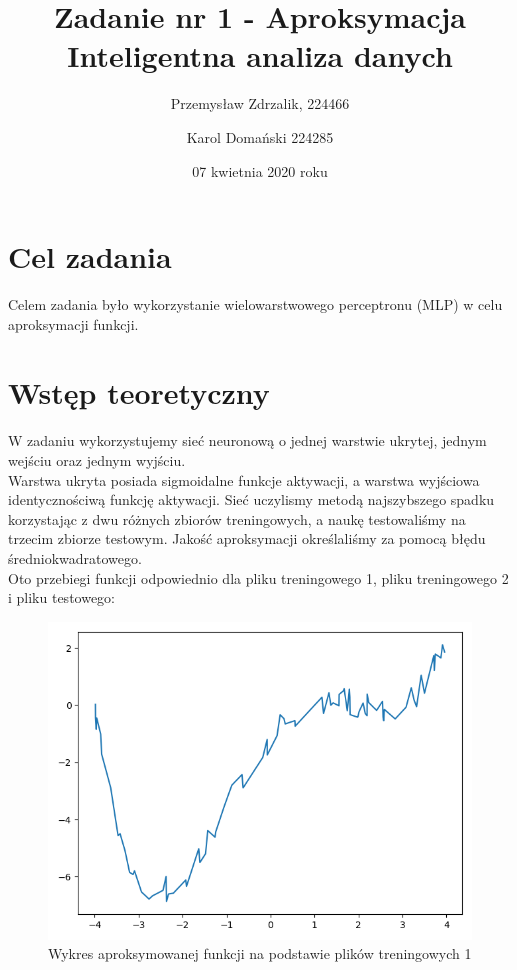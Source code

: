 \documentclass[12pt]{article}
\title{{\bf Zadanie nr 1 - Aproksymacja}\linebreak
Inteligentna analiza danych}
\author{Przemysław Zdrzalik, 224466 \and Karol Domański 224285}
\date{07 kwietnia 2020 roku}
\begin{document}
\clearpage\maketitle
\thispagestyle{empty}
\newpage
\setcounter{page}{1}
\section{Cel zadania}

Celem zadania było wykorzystanie wielowarstwowego perceptronu (MLP) w celu aproksymacji funkcji.

\section{Wstęp teoretyczny}

W zadaniu wykorzystujemy sieć neuronową o jednej warstwie ukrytej, jednym wejściu oraz jednym wyjściu. \\ Warstwa ukryta posiada sigmoidalne funkcje aktywacji, a warstwa wyjściowa identycznościwą funkcję aktywacji. Sieć uczylismy metodą najszybszego spadku  korzystając z dwu różnych zbiorów treningowych, a naukę testowaliśmy na trzecim zbiorze testowym.
Jakość aproksymacji określaliśmy za pomocą błędu średniokwadratowego.\\

Oto przebiegi funkcji odpowiednio dla pliku treningowego 1, pliku treningowego 2 i pliku testowego:

\begin{figure}[!htb]
 \centering
 \includegraphics[width=12cm]{originalfunc1.png}
 \caption{Wykres aproksymowanej funkcji na podstawie plików treningowych 1}
 \vspace{-0.3cm}
 \label{originalfunc1}
\end{figure}
\end{document}
